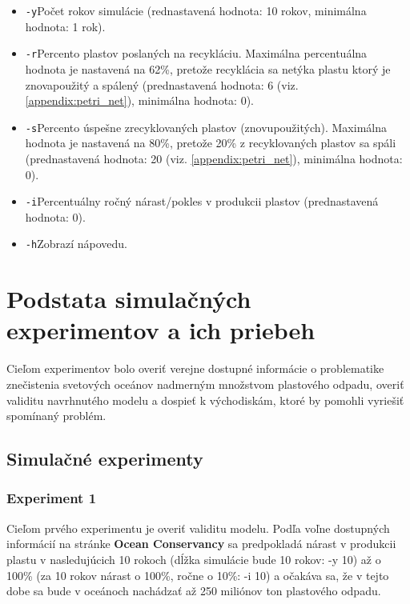 \documentclass[a4paper, 11pt]{article}
\begin{document}
\begin{itemize}
	\item \texttt{-y}\quad Počet rokov simulácie (rednastavená hodnota: 10 rokov, minimálna hodnota: 1 rok).
	\item \texttt{-r}\quad Percento plastov poslaných na recykláciu. Maximálna percentuálna hodnota je nastavená na 62\%, pretože recyklácia sa netýka plastu ktorý je znovapoužitý a spálený (prednastavená hodnota: 6 (viz. \ref{appendix:petri_net}), minimálna hodnota: 0).
	\item \texttt{-s}\quad Percento úspešne zrecyklovaných plastov (znovupoužitých). Maximálna hodnota je nastavená na 80\%, pretože 20\% z recyklovaných plastov sa spáli (prednastavená hodnota: 20 (viz. \ref{appendix:petri_net}), minimálna hodnota: 0).
	\item \texttt{-i}\quad Percentuálny ročný nárast/pokles v produkcii plastov (prednastavená hodnota: 0).
	\item \texttt{-h}\quad Zobrazí nápovedu.
\end{itemize}

\pagebreak
\section{Podstata simulačných experimentov a ich priebeh}

Cieľom experimentov bolo overiť verejne dostupné informácie o problematike znečistenia svetových oceánov nadmerným množstvom plastového odpadu, overiť validitu navrhnutého modelu a dospieť k východiskám, ktoré by pomohli vyriešiť spomínaný problém.

\subsection{Simulačné experimenty}

\subsubsection{Experiment 1}
\label{label:exp1}

Cieľom prvého experimentu je overiť validitu modelu. Podľa voľne dostupných informácií na stránke \textbf{Ocean Conservancy} \cite{ocean_conservancy} sa predpokladá nárast v produkcii plastu v nasledujúcich 10 rokoch (dĺžka simulácie bude 10 rokov: -y 10) až o 100\% (za 10 rokov nárast o 100\%, ročne o 10\%: -i 10) a očakáva sa, že v tejto dobe sa bude v oceánoch nachádzať až 250 miliónov ton plastového odpadu.
\end{document}
